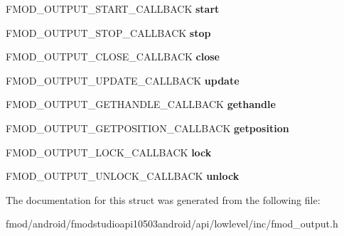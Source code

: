 \begin{DoxyCompactItemize}
\item 
\hypertarget{struct_f_m_o_d___o_u_t_p_u_t___d_e_s_c_r_i_p_t_i_o_n_a3898df713781eba4e5dc7ca213cf5d52}{F\+M\+O\+D\+\_\+\+O\+U\+T\+P\+U\+T\+\_\+\+S\+T\+A\+R\+T\+\_\+\+C\+A\+L\+L\+B\+A\+C\+K {\bfseries start}}\label{struct_f_m_o_d___o_u_t_p_u_t___d_e_s_c_r_i_p_t_i_o_n_a3898df713781eba4e5dc7ca213cf5d52}

\item 
\hypertarget{struct_f_m_o_d___o_u_t_p_u_t___d_e_s_c_r_i_p_t_i_o_n_ae678f8389b77b6553491a53d04582fe3}{F\+M\+O\+D\+\_\+\+O\+U\+T\+P\+U\+T\+\_\+\+S\+T\+O\+P\+\_\+\+C\+A\+L\+L\+B\+A\+C\+K {\bfseries stop}}\label{struct_f_m_o_d___o_u_t_p_u_t___d_e_s_c_r_i_p_t_i_o_n_ae678f8389b77b6553491a53d04582fe3}

\item 
\hypertarget{struct_f_m_o_d___o_u_t_p_u_t___d_e_s_c_r_i_p_t_i_o_n_a891b4be9f4dff65adf1ea95aad3a93e5}{F\+M\+O\+D\+\_\+\+O\+U\+T\+P\+U\+T\+\_\+\+C\+L\+O\+S\+E\+\_\+\+C\+A\+L\+L\+B\+A\+C\+K {\bfseries close}}\label{struct_f_m_o_d___o_u_t_p_u_t___d_e_s_c_r_i_p_t_i_o_n_a891b4be9f4dff65adf1ea95aad3a93e5}

\item 
\hypertarget{struct_f_m_o_d___o_u_t_p_u_t___d_e_s_c_r_i_p_t_i_o_n_a32b2ba46bc007fc8e07507b9f5b3ed4e}{F\+M\+O\+D\+\_\+\+O\+U\+T\+P\+U\+T\+\_\+\+U\+P\+D\+A\+T\+E\+\_\+\+C\+A\+L\+L\+B\+A\+C\+K {\bfseries update}}\label{struct_f_m_o_d___o_u_t_p_u_t___d_e_s_c_r_i_p_t_i_o_n_a32b2ba46bc007fc8e07507b9f5b3ed4e}

\item 
\hypertarget{struct_f_m_o_d___o_u_t_p_u_t___d_e_s_c_r_i_p_t_i_o_n_a9c601b0a736530c9352005b719b7d795}{F\+M\+O\+D\+\_\+\+O\+U\+T\+P\+U\+T\+\_\+\+G\+E\+T\+H\+A\+N\+D\+L\+E\+\_\+\+C\+A\+L\+L\+B\+A\+C\+K {\bfseries gethandle}}\label{struct_f_m_o_d___o_u_t_p_u_t___d_e_s_c_r_i_p_t_i_o_n_a9c601b0a736530c9352005b719b7d795}

\item 
\hypertarget{struct_f_m_o_d___o_u_t_p_u_t___d_e_s_c_r_i_p_t_i_o_n_ae4977ffd6d2c31a700f186f396324ef1}{F\+M\+O\+D\+\_\+\+O\+U\+T\+P\+U\+T\+\_\+\+G\+E\+T\+P\+O\+S\+I\+T\+I\+O\+N\+\_\+\+C\+A\+L\+L\+B\+A\+C\+K {\bfseries getposition}}\label{struct_f_m_o_d___o_u_t_p_u_t___d_e_s_c_r_i_p_t_i_o_n_ae4977ffd6d2c31a700f186f396324ef1}

\item 
\hypertarget{struct_f_m_o_d___o_u_t_p_u_t___d_e_s_c_r_i_p_t_i_o_n_a01c26fcfb4c7d79ab40270f128c6d743}{F\+M\+O\+D\+\_\+\+O\+U\+T\+P\+U\+T\+\_\+\+L\+O\+C\+K\+\_\+\+C\+A\+L\+L\+B\+A\+C\+K {\bfseries lock}}\label{struct_f_m_o_d___o_u_t_p_u_t___d_e_s_c_r_i_p_t_i_o_n_a01c26fcfb4c7d79ab40270f128c6d743}

\item 
\hypertarget{struct_f_m_o_d___o_u_t_p_u_t___d_e_s_c_r_i_p_t_i_o_n_ab91f638570b30e37560d58b9a8d493d5}{F\+M\+O\+D\+\_\+\+O\+U\+T\+P\+U\+T\+\_\+\+U\+N\+L\+O\+C\+K\+\_\+\+C\+A\+L\+L\+B\+A\+C\+K {\bfseries unlock}}\label{struct_f_m_o_d___o_u_t_p_u_t___d_e_s_c_r_i_p_t_i_o_n_ab91f638570b30e37560d58b9a8d493d5}

\end{DoxyCompactItemize}


The documentation for this struct was generated from the following file\+:\begin{DoxyCompactItemize}
\item 
fmod/android/fmodstudioapi10503android/api/lowlevel/inc/fmod\+\_\+output.\+h\end{DoxyCompactItemize}
